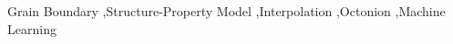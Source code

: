 \documentclass[final,twocolumn,12pt]{elsarticle}
\begin{document}
\begin{frontmatter}
		
		
		
		
		
		
		
		
		
		\begin{keyword}
			Grain Boundary \sep Structure-Property Model \sep Interpolation \sep Octonion \sep Machine Learning %
		\end{keyword}
		
	\end{frontmatter}
	
\end{document}
